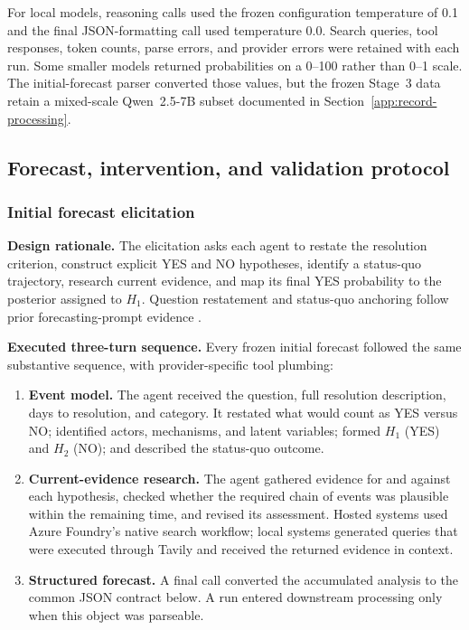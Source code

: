 For local models, reasoning calls used the frozen configuration temperature of 0.1 and
the final JSON-formatting call used temperature 0.0.  Search queries, tool responses,
token counts, parse errors, and provider errors were retained with each run.  Some
smaller models returned probabilities on a 0--100 rather than 0--1 scale.  The
initial-forecast parser converted those values, but the frozen Stage~3 data retain a
mixed-scale Qwen~2.5-7B subset documented in
Section~\ref{app:record-processing}.

\subsection{Forecast, intervention, and validation protocol}
\label{app:exp1-protocol}

\subsubsection{Initial forecast elicitation}
\label{app:prompts}

\noindent\textbf{Design rationale.}
The elicitation asks each agent to restate the resolution criterion, construct
explicit YES and NO hypotheses, identify a status-quo trajectory, research
current evidence, and map its final YES probability to the posterior assigned to
$H_1$. Question restatement and status-quo anchoring follow prior
forecasting-prompt evidence \citep{halawi2024approaching,wilson2025automated}.

\noindent\textbf{Executed three-turn sequence.}
Every frozen initial forecast followed the same substantive sequence, with
provider-specific tool plumbing:

\begin{enumerate}
  \item \textbf{Event model.}  The agent received the question, full resolution
        description, days to resolution, and category.  It restated what would count
        as YES versus NO; identified actors, mechanisms, and latent variables; formed
        $H_1$ (YES) and $H_2$ (NO); and described the status-quo outcome.
  \item \textbf{Current-evidence research.}  The agent gathered evidence for and
        against each hypothesis, checked whether the required chain of events was
        plausible within the remaining time, and revised its assessment.  Hosted
        systems used Azure Foundry's native search workflow; local systems generated
        queries that were executed through Tavily and received the returned evidence
        in context.
  \item \textbf{Structured forecast.}  A final call converted the accumulated analysis
        to the common JSON contract below.  A run entered downstream processing only
        when this object was parseable.
\end{enumerate}

